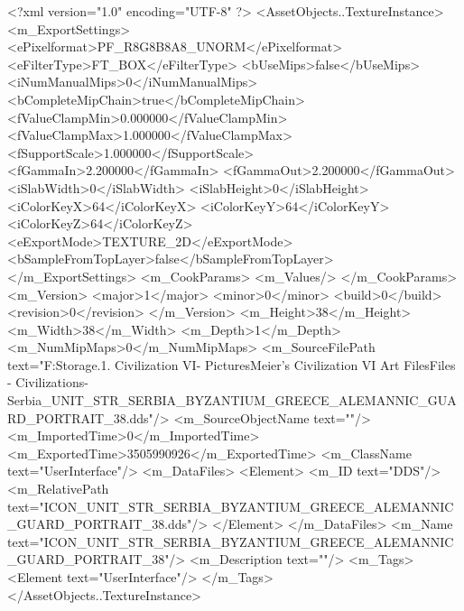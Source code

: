 <?xml version="1.0" encoding="UTF-8" ?>
<AssetObjects..TextureInstance>
	<m_ExportSettings>
		<ePixelformat>PF_R8G8B8A8_UNORM</ePixelformat>
		<eFilterType>FT_BOX</eFilterType>
		<bUseMips>false</bUseMips>
		<iNumManualMips>0</iNumManualMips>
		<bCompleteMipChain>true</bCompleteMipChain>
		<fValueClampMin>0.000000</fValueClampMin>
		<fValueClampMax>1.000000</fValueClampMax>
		<fSupportScale>1.000000</fSupportScale>
		<fGammaIn>2.200000</fGammaIn>
		<fGammaOut>2.200000</fGammaOut>
		<iSlabWidth>0</iSlabWidth>
		<iSlabHeight>0</iSlabHeight>
		<iColorKeyX>64</iColorKeyX>
		<iColorKeyY>64</iColorKeyY>
		<iColorKeyZ>64</iColorKeyZ>
		<eExportMode>TEXTURE_2D</eExportMode>
		<bSampleFromTopLayer>false</bSampleFromTopLayer>
	</m_ExportSettings>
	<m_CookParams>
		<m_Values/>
	</m_CookParams>
	<m_Version>
		<major>1</major>
		<minor>0</minor>
		<build>0</build>
		<revision>0</revision>
	</m_Version>
	<m_Height>38</m_Height>
	<m_Width>38</m_Width>
	<m_Depth>1</m_Depth>
	<m_NumMipMaps>0</m_NumMipMaps>
	<m_SourceFilePath text="F:\Mod Storage\2.1. Civilization VI\Mods\Archive - Pictures\Sid Meier's Civilization VI Art Files\Art Files - Civilizations\Civilization - Serbia\ICON_UNIT_STR_SERBIA_BYZANTIUM_GREECE_ALEMANNIC_GUARD_PORTRAIT_38.dds"/>
	<m_SourceObjectName text=""/>
	<m_ImportedTime>0</m_ImportedTime>
	<m_ExportedTime>3505990926</m_ExportedTime>
	<m_ClassName text="UserInterface"/>
	<m_DataFiles>
		<Element>
			<m_ID text="DDS"/>
			<m_RelativePath text="ICON_UNIT_STR_SERBIA_BYZANTIUM_GREECE_ALEMANNIC_GUARD_PORTRAIT_38.dds"/>
		</Element>
	</m_DataFiles>
	<m_Name text="ICON_UNIT_STR_SERBIA_BYZANTIUM_GREECE_ALEMANNIC_GUARD_PORTRAIT_38"/>
	<m_Description text=""/>
	<m_Tags>
		<Element text="UserInterface"/>
	</m_Tags>
</AssetObjects..TextureInstance>

